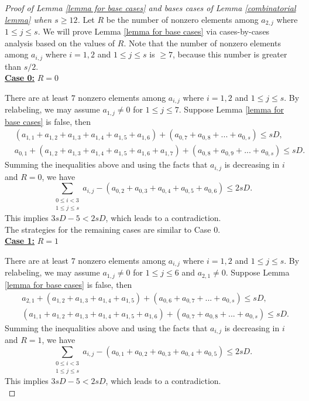 \documentclass[10pt,a4paper]{amsart}
\begin{document}
\begin{proof}[Proof of Lemma \ref{lemma for base cases} and bases cases of Lemma \ref{combinatorial lemma} when $s\geq 12$]
    Let $R$ be the number of nonzero elements among $a_{2,j}$ where $1\leq j\leq s$. We will prove Lemma \ref{lemma for base cases} via cases-by-cases analysis based on the values of $R$. Note that the number of nonzero elements among $a_{i,j}$ where $i=1,2$ and $1\leq j\leq s$ is $\geq 7$, because this number is greater than $s/2$.\\

    \noindent\underline{\textbf{Case 0:}} $R=0$

    There are at least $7$ nonzero elements among $a_{i,j}$ where $i=1,2$ and $1\leq j\leq s$. By relabeling, we may assume $a_{1,j}\neq 0$ for $1\leq j\leq 7$. Suppose Lemma \ref{lemma for base cases} is false, then
    \begin{align*}
        &(a_{1,1}+a_{1,2}+a_{1,3}+a_{1,4}+a_{1,5}+a_{1,6})+(a_{0,7}+a_{0,8}+...+a_{0,s})\leq sD,\\
        &a_{0,1}+(a_{1,2}+a_{1,3}+a_{1,4}+a_{1,5}+a_{1,6}+a_{1,7})+(a_{0,8}+a_{0,9}+...+a_{0,s})\leq sD.
    \end{align*}
    Summing the inequalities above and using the facts that $a_{i,j}$ is decreasing in $i$ and $R=0$, we have
    \begin{equation*}
        \sum_{\substack{0\leq i<3\\1\leq j\leq s}}a_{i,j}-(a_{0,2}+a_{0,3}+a_{0,4}+a_{0,5}+a_{0,6})\leq 2sD.
    \end{equation*}
    This implies $3sD-5<2sD$, which leads to a contradiction.\\

    The strategies for the remaining cases are similar to Case $0$.\\

    \noindent\underline{\textbf{Case 1:}} $R=1$

    There are at least $7$ nonzero elements among $a_{i,j}$ where $i=1,2$ and $1\leq j\leq s$. By relabeling, we may assume $a_{1,j}\neq 0$ for $1\leq j\leq 6$ and $a_{2,1}\neq 0$. Suppose Lemma \ref{lemma for base cases} is false, then
    \begin{align*}
        &a_{2,1}+(a_{1,2}+a_{1,3}+a_{1,4}+a_{1,5})+(a_{0,6}+a_{0,7}+...+a_{0,s})\leq sD,\\
        &(a_{1,1}+a_{1,2}+a_{1,3}+a_{1,4}+a_{1,5}+a_{1,6})+(a_{0,7}+a_{0,8}+...+a_{0,s})\leq sD.
    \end{align*}
    Summing the inequalities above and using the facts that $a_{i,j}$ is decreasing in $i$ and $R=1$, we have
    \begin{equation*}
        \sum_{\substack{0\leq i<3\\1\leq j\leq s}}a_{i,j}-(a_{0,1}+a_{0,2}+a_{0,3}+a_{0,4}+a_{0,5})\leq 2sD.
    \end{equation*}
    This implies $3sD-5<2sD$, which leads to a contradiction.\\


\end{proof}
\end{document}

